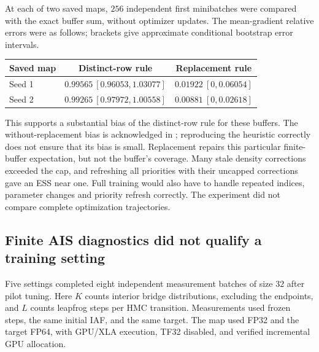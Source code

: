 At each of two saved maps, $256$ independent first minibatches were compared
with the exact buffer sum, without optimizer updates. The mean-gradient
relative errors were as follows; brackets give approximate conditional
bootstrap error intervals.
\begin{center}
\small
\begin{tabular}{lcc}
\toprule
Saved map & Distinct-row rule & Replacement rule \\
\midrule
Seed 1 & $0.99565\ [0.96053,1.03077]$
       & $0.01922\ [0,0.06054]$ \\
Seed 2 & $0.99265\ [0.97972,1.00558]$
       & $0.00881\ [0,0.02618]$ \\
\bottomrule
\end{tabular}
\end{center}
This supports a substantial bias of the distinct-row rule for these buffers.
The without-replacement bias is acknowledged in
\citet[Section 3.2]{midgley2023fab}; reproducing the heuristic correctly does
not ensure that its bias is small. Replacement repairs this particular
finite-buffer expectation, but not the buffer's coverage. Many stale density
corrections exceeded the cap, and refreshing all priorities with their
uncapped corrections gave an ESS near one. Full training would also have to
handle repeated indices, parameter changes and priority refresh correctly.
The experiment did not compare complete optimization trajectories.

\subsection{Finite AIS diagnostics did not qualify a training setting}

Five settings completed eight independent measurement batches of size $32$
after pilot tuning. Here $K$ counts interior bridge distributions, excluding
the endpoints, and $L$ counts leapfrog steps per HMC transition. Measurements
used frozen steps, the same initial IAF, and the same target. The map used
FP32 and the target FP64, with GPU/XLA execution, TF32 disabled, and verified
incremental GPU allocation.

